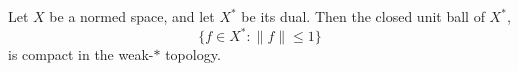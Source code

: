 \documentclass[12pt]{article}
\begin{document}
Let $X$ be a normed space, and let $X^*$ be its dual. Then the closed 
unit ball of $X^*$, $$\{f\in X^* : \|f\|\leq 1\}$$
is compact in the weak-$*$ topology.
\end{document}
